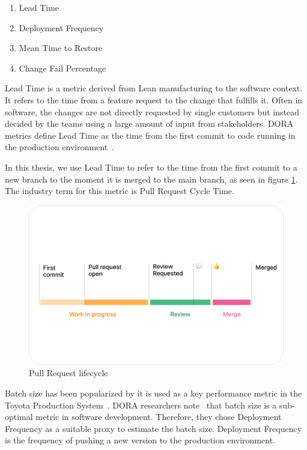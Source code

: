 \begin{enumerate}
\item Lead Time
\item Deployment Frequency
\item Mean Time to Restore
\item Change Fail Percentage
\end{enumerate}

Lead Time is a metric derived from Lean manufacturing to the software context. It refers to the time from a feature request to the change that fulfills it. Often in software, the changes are not directly requested by single customers but instead decided by the teams using a large amount of input from stakeholders. DORA metrics define Lead Time as the time from the first commit to code running in the production environment~\cite{forsgren_accelerate_2018}.

In this thesis, we use Lead Time to refer to the time from the first commit to a new branch to the moment it is merged to the main branch, as seen in figure \ref{fig:CycleTime}. The industry term for this metric is Pull Request Cycle Time. 

\begin{figure}[ht]
    \begin{center}
        \includegraphics[width=13.5cm]{images/cycletime-defined}
        \caption{Pull Request lifecycle~\cite{swarmia_reducing_2022}}
        \label{fig:CycleTime}
    \end{center}
\end{figure}

Batch size has been popularized by it is used as a key performance metric in the Toyota Production System~\cite{ono_toyota_1988}. DORA researchers note~\cite{forsgren_accelerate_2018} that batch size is a sub-optimal metric in software development. Therefore, they chose Deployment Frequency as a suitable proxy to estimate the batch size. Deployment Frequency is the frequency of pushing a new version to the production environment.  

